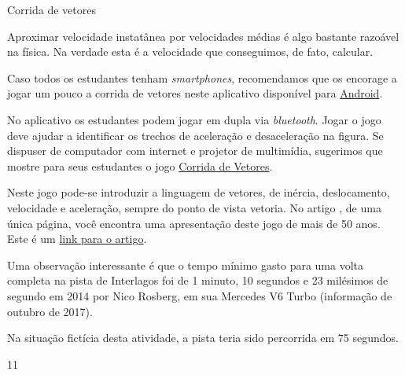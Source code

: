 

\begin{sugestions}{Corrida de vetores}
{
Aproximar velocidade instatânea por velocidades médias é algo bastante razoável na física. Na verdade esta é a velocidade que conseguimos, de fato, calcular.

Caso todos os estudantes tenham \textit{smartphones}, recomendamos que os encorage a jogar um pouco a corrida de vetores neste aplicativo disponível para \href{https://play.google.com/store/apps/details?id=zielanski.com.vectorrace\&hl=pt}{Android}.

No aplicativo os estudantes podem jogar em dupla via \textit{bluetooth}.
Jogar o jogo deve ajudar a identificar os trechos de aceleração e desaceleração na figura.
Se dispuser de computador com internet e projetor de multimídia, sugerimos que mostre para seus estudantes o jogo \href{http://www.harmmade.com/vectorracer/\#interlagos}{Corrida de Vetores}.

Neste jogo pode-se introduzir a linguagem de vetores, de inércia, deslocamento, velocidade e aceleração, sempre do ponto de vista vetoria.
No artigo \citep{oliveira2009}, de uma única página, você encontra uma apresentação deste jogo de mais de 50 anos.
Este é um \href{http://www.sbfisica.org.br/fne/Vol10/Num1/a08.pdf}{link para o artigo}.

Uma observação interessante é que o tempo mínimo gasto para uma volta completa na pista de Interlagos foi de 1 minuto, 10 segundos e 23 milésimos de segundo em 2014 por Nico Rosberg, em sua Mercedes V6 Turbo (informação de outubro de 2017).

Na situação fictícia desta atividade, a pista teria sido percorrida em 75 segundos.
}{1}{1}
\end{sugestions}



